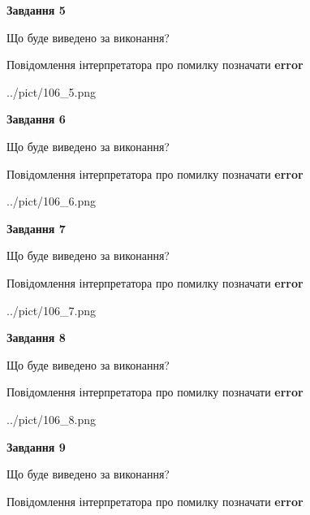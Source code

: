 \documentclass[11pt, ukrainian]{article}
\begin{document}
{\begin {large}
{\begin {center}\textbf{Завдання 5}\end {center}}\par
Що буде виведено за виконання? \par
Повідомлення інтерпретатора про помилку позначати \textbf{error}

\begin{center}
	{../pict/106_5.png}
\end{center}
\newpage

{\begin {center}\textbf{Завдання 6}\end {center}}\par
Що буде виведено за виконання? \par
Повідомлення інтерпретатора про помилку позначати \textbf{error}

\begin{center}
	{../pict/106_6.png}
\end{center}
\newpage

{\begin {center}\textbf{Завдання 7}\end {center}}\par
Що буде виведено за виконання? \par
Повідомлення інтерпретатора про помилку позначати \textbf{error}

\begin{center}
	{../pict/106_7.png}
\end{center}
\newpage

{\begin {center}\textbf{Завдання 8}\end {center}}\par
Що буде виведено за виконання? \par
Повідомлення інтерпретатора про помилку позначати \textbf{error}

\begin{center}
	{../pict/106_8.png}
\end{center}
\newpage

{\begin {center}\textbf{Завдання 9}\end {center}}\par
Що буде виведено за виконання? \par
Повідомлення інтерпретатора про помилку позначати \textbf{error}


\end{large}}
\end{document}
